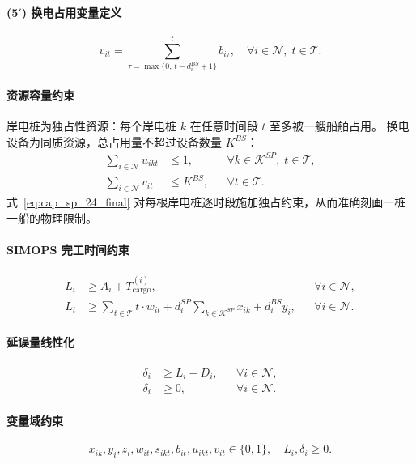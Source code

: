 \documentclass[UTF8, a4paper, 12pt]{ctexart}
\theoremstyle{plain}
\theoremstyle{definition}
\theoremstyle{remark}
\begin{document}
\paragraph{(5$'$) 换电占用变量定义}
\begin{equation}
v_{it} = \sum_{\tau = \max\{0,\, t-d_i^{BS}+1\}}^{t} b_{i\tau},
\quad \forall i \in \mathcal{N},\; t \in \mathcal{T}.
\label{eq:link_bs_24_final}
\end{equation}

\paragraph{资源容量约束}
岸电桩为独占性资源：每个岸电桩 $k$ 在任意时间段 $t$ 至多被一艘船舶占用。
换电设备为同质资源，总占用量不超过设备数量 $K^{BS}$：
\begin{align}
\sum_{i \in \mathcal{N}} u_{ikt}
&\le 1,
&& \forall k \in \mathcal{K}^{SP},\; t \in \mathcal{T},
\label{eq:cap_sp_24_final} \\
\sum_{i \in \mathcal{N}} v_{it}
&\le K^{BS},
&& \forall t \in \mathcal{T}.
\label{eq:cap_bs_24_final}
\end{align}
式~\eqref{eq:cap_sp_24_final} 对每根岸电桩逐时段施加独占约束，从而准确刻画一桩一船的物理限制。

\paragraph{SIMOPS 完工时间约束}
\begin{align}
L_i &\ge A_i + T^{(i)}_{\text{cargo}},
&& \forall i \in \mathcal{N},
\label{eq:cargo_finish_24_final} \\
L_i &\ge 
\sum_{t \in \mathcal{T}} t \cdot w_{it}
+ d_i^{SP}\sum_{k \in \mathcal{K}^{SP}} x_{ik}
+ d_i^{BS} y_i,
&& \forall i \in \mathcal{N}.
\label{eq:service_finish_24_final}
\end{align}

\paragraph{延误量线性化}
\begin{align}
\delta_i &\ge L_i - D_i,
&& \forall i \in \mathcal{N}, \\
\delta_i &\ge 0,
&& \forall i \in \mathcal{N}.
\end{align}

\paragraph{变量域约束}
\begin{equation}
x_{ik},y_i,z_i,w_{it},s_{ikt},b_{it},u_{ikt},v_{it} \in \{0,1\},
\quad
L_i,\delta_i \ge 0.
\end{equation}
\end{document}
